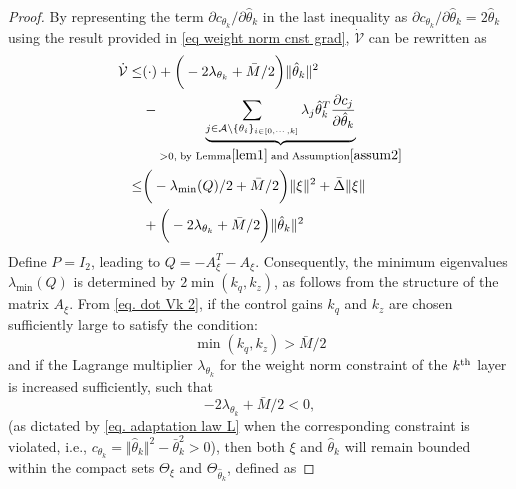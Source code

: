 \documentclass[lettersize,journal]{IEEEtran}
\begin{document}
\begin{proof}
By representing the term $\partial c_{\theta_k}/\partial \hat\theta_k$ in the last inequality as $\partial c_{\theta_k}/\partial \hat\theta_k=2\hat\theta_k$ using the result provided in \eqref{eq weight norm cnst grad}, $\dot {\mathcal V}$ can be rewritten as
\begin{equation}
    \begin{aligned}
        \dot {\mathcal V} \le&
        (\cdot) + 
        \bigg(
            -2\lambda _{\theta_k}+{\bar M}/{2}
        \bigg)
        \Vert\hat\theta_k\Vert^2 
        \\
        &- \underbrace{
        \sum_{j\in\mathcal{A}\setminus \{\theta_i\}_{i\in[0,\cdots,k]}}\lambda_j\hat\theta_k^T{\partial c_j\over\partial \hat\theta_k}
        }_{>0, \text{\;by Lemma} \ref{lem1} \text{\;and\;} \text{Assumption} \ref{assum2}}	
        \\
        \le&
        \bigg(
            -{\lambda_\text{min}(Q)}/{2}+{\bar M}/{2}
        \bigg)
        \Vert\xi\Vert^2
        +\bar \Delta \Vert \xi\Vert 
        \\&
        + 
        \bigg(
            -2\lambda _{\theta_k}+{\bar M}/{2}
        \bigg)
        \Vert\hat\theta_k\Vert^2 
    \end{aligned}
    \label{eq. dot Vk 2}
\end{equation}
Define $P=I_2$, leading to $Q = -A_{\xi}^T - A_{\xi}$. Consequently, the minimum eigenvalues ${\lambda_{\text{min}}(Q)}$ is determined by $2\min({k_q},{k_z})$, as follows from the structure of the matrix $A_{\xi}$. From \eqref{eq. dot Vk 2}, if the control gains ${k_q}$ and ${k_z}$ are chosen sufficiently large to satisfy the condition:
\begin{equation}
    \min({k_q},{k_z})>\bar M/2
    \label{eq. ctrl stable condition}
\end{equation}
and if the Lagrange multiplier $\lambda_{\theta_k}$ for the weight norm constraint of the $k\textsuperscript{th}$ layer is increased sufficiently, such that
\begin{equation}\label{eq: lambda bk}
    -2\lambda_{\theta_k} +{\bar M/ 2}<0,  
\end{equation}
(as dictated by \eqref{eq. adaptation law L} when the corresponding constraint is violated, i.e., $c_{\theta_k}=\Vert \hat\theta_k\Vert^2 -\bar\theta_k^2 > 0$), then both $\xi$ and $\hat\theta_k$ will remain bounded within the compact sets $\Theta_\xi$ and $\Theta_{\hat\theta_k}$, defined as

\end{proof}
\end{document}
